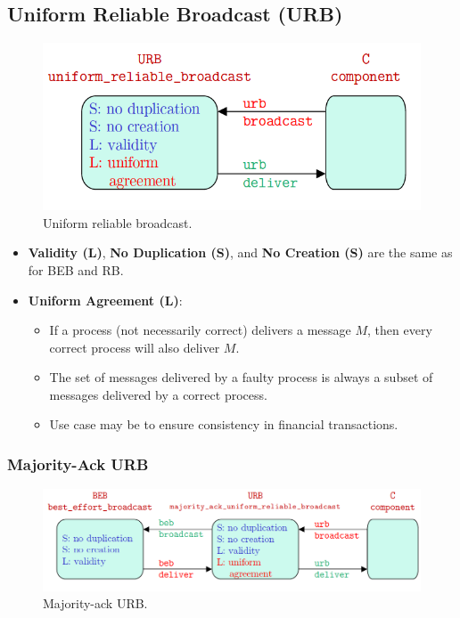 \documentclass[11pt]{article}
\begin{document}
\subsection{Uniform Reliable Broadcast (URB)}
\begin{figure}[htb!]
  \centering
  \caption{Uniform reliable broadcast.}
  \includegraphics[scale=0.3]{urb}
\end{figure}

\begin{itemize}
  \item \textbf{Validity (L)}, \textbf{No Duplication (S)}, and \textbf{No Creation (S)} are the same as for BEB and RB.
  \item \textbf{Uniform Agreement (L)}:
    \begin{itemize}
      \item If a process (not necessarily correct) delivers a message $M$, then every correct process will also deliver $M$.
      \item The set of messages delivered by a faulty process is always a subset of messages delivered by a correct process.
      \item Use case may be to ensure consistency in financial transactions.
    \end{itemize}
\end{itemize}

\subsubsection{Majority-Ack URB}
\begin{figure}[htb!]
  \centering
  \caption{Majority-ack URB.}
  \includegraphics[scale=0.3]{majorityack}
\end{figure}
\end{document}
